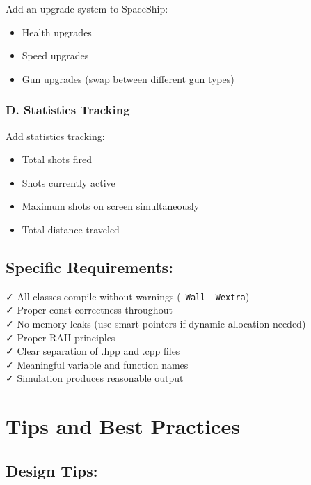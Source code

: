 \documentclass[
]{article}
\providecommand{\tightlist}{%
  \setlength{\itemsep}{0pt}\setlength{\parskip}{0pt}}
\begin{document}
Add an upgrade system to SpaceShip:

\begin{itemize}
\tightlist
\item
  Health upgrades
\item
  Speed upgrades
\item
  Gun upgrades (swap between different gun types)
\end{itemize}

\subsubsection{D. Statistics Tracking}\label{d.-statistics-tracking}

Add statistics tracking:

\begin{itemize}
\tightlist
\item
  Total shots fired
\item
  Shots currently active
\item
  Maximum shots on screen simultaneously
\item
  Total distance traveled
\end{itemize}

\subsection{Specific Requirements:}\label{specific-requirements}

✓ All classes compile without warnings (\texttt{-Wall\ -Wextra})\\
✓ Proper const-correctness throughout\\
✓ No memory leaks (use smart pointers if dynamic allocation needed)\\
✓ Proper RAII principles\\
✓ Clear separation of .hpp and .cpp files\\
✓ Meaningful variable and function names\\
✓ Simulation produces reasonable output

\section{Tips and Best Practices}\label{tips-and-best-practices}

\subsection{Design Tips:}\label{design-tips}
\end{document}
